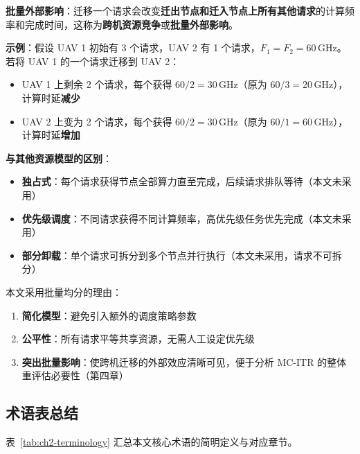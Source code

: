 \textbf{批量外部影响}：迁移一个请求会改变\textbf{迁出节点和迁入节点上所有其他请求}的计算频率和完成时间，这称为\textbf{跨机资源竞争}或\textbf{批量外部影响}。

\textbf{示例}：假设 UAV 1 初始有 3 个请求，UAV 2 有 1 个请求，$F_1 = F_2 = 60\,\mathrm{GHz}$。若将 UAV 1 的一个请求迁移到 UAV 2：
\begin{itemize}
    \item UAV 1 上剩余 2 个请求，每个获得 $60 / 2 = 30\,\mathrm{GHz}$（原为 $60 / 3 = 20\,\mathrm{GHz}$），计算时延\textbf{减少}
    \item UAV 2 上变为 2 个请求，每个获得 $60 / 2 = 30\,\mathrm{GHz}$（原为 $60 / 1 = 60\,\mathrm{GHz}$），计算时延\textbf{增加}
\end{itemize}

\textbf{与其他资源模型的区别}：
\begin{itemize}
    \item \textbf{独占式}：每个请求获得节点全部算力直至完成，后续请求排队等待（本文未采用）
    \item \textbf{优先级调度}：不同请求获得不同计算频率，高优先级任务优先完成（本文未采用）
    \item \textbf{部分卸载}：单个请求可拆分到多个节点并行执行（本文未采用，请求不可拆分）
\end{itemize}

本文采用批量均分的理由：
\begin{enumerate}
    \item \textbf{简化模型}：避免引入额外的调度策略参数
    \item \textbf{公平性}：所有请求平等共享资源，无需人工设定优先级
    \item \textbf{突出批量影响}：使跨机迁移的外部效应清晰可见，便于分析 MC-ITR 的整体重评估必要性（第四章）
\end{enumerate}

\subsection{术语表总结}
\label{sec:ch2-term-summary}

表~\ref{tab:ch2-terminology} 汇总本文核心术语的简明定义与对应章节。

